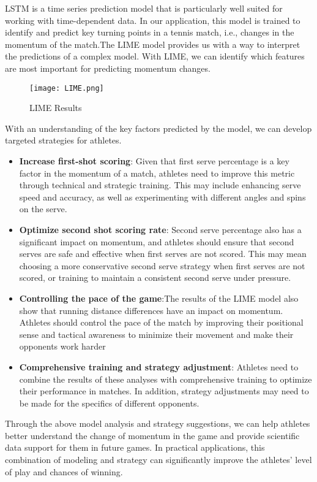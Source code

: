 \documentclass{mcmthesis}
\begin{document}
LSTM is a time series prediction model that is particularly well suited for working with time-dependent data. In our application, this model is trained to identify and predict key turning points in a tennis match, i.e., changes in the momentum of the match.The LIME model provides us with a way to interpret the predictions of a complex model. With LIME, we can identify which features are most important for predicting momentum changes.

\begin{figure}[!htb]
    \centering
    \texttt{[image: LIME.png]}
    \caption{LIME Results} \label{fig:sample_value}
\end{figure}

With an understanding of the key factors predicted by the model, we can develop targeted strategies for athletes.

\begin{itemize}
    \item[] {\bf Increase first-shot scoring}: Given that first serve percentage is a key factor in the momentum of a match, athletes need to improve this metric through technical and strategic training. This may include enhancing serve speed and accuracy, as well as experimenting with different angles and spins on the serve.

    \item[] {\bf Optimize second shot scoring rate}: Second serve percentage also has a significant impact on momentum, and athletes should ensure that second serves are safe and effective when first serves are not scored. This may mean choosing a more conservative second serve strategy when first serves are not scored, or training to maintain a consistent second serve under pressure.

    \item[] {\bf Controlling the pace of the game}:The results of the LIME model also show that running distance differences have an impact on momentum. Athletes should control the pace of the match by improving their positional sense and tactical awareness to minimize their movement and make their opponents work harder

    \item[] {\bf Comprehensive training and strategy adjustment}: Athletes need to combine the results of these analyses with comprehensive training to optimize their performance in matches. In addition, strategy adjustments may need to be made for the specifics of different opponents.

\end{itemize}
Through the above model analysis and strategy suggestions, we can help athletes better understand the change of momentum in the game and provide scientific data support for them in future games. In practical applications, this combination of modeling and strategy can significantly improve the athletes' level of play and chances of winning.
\end{document}
